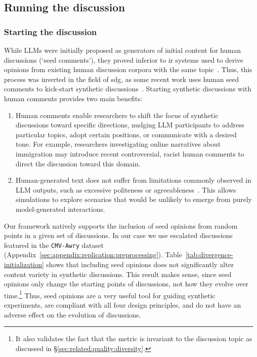 \subsection{Running the discussion}
\label{sec:methodology:management}

\subsubsection{Starting the discussion}
\label{sec:methodology:seed}

While LLMs were initially proposed as generators of initial content for human discussions (`seed comments'), they proved inferior to \ac{ir} systems used to derive opinions from existing human discussion corpora with the same topic~\cite{small-polis-llm}. Thus, this process was inverted in the field of \ac{sdg}, as some recent work uses human seed comments to kick-start synthetic discussions~\cite{balog_2024, cho-etal-2024-language}. Starting synthetic discussions with human comments provides two main benefits:

\begin{enumerate}
	\item Human comments enable researchers to shift the focus of synthetic discussions toward specific directions, nudging LLM participants to address particular topics, adopt certain positions, or communicate with a desired tone. For example, researchers investigating online narratives about immigration may introduce recent controversial, racist human comments to direct the discussion toward this domain.
	
	\item Human-generated text does not suffer from limitations commonly observed in LLM outputs, such as excessive politeness or agreeableness~\cite{park_2023_game,anthis_2025,rossi_2024}. This allows simulations to explore scenarios that would be unlikely to emerge from purely model-generated interactions.
\end{enumerate}

Our framework natively supports the inclusion of seed opinions from random points in a given set of discussions. In our case we use escalated discussions featured in the \texttt{CMV-Awry} dataset \cite{chang-danescu-niculescu-mizil-2019-trouble} (Appendix~\ref{sec:appendix:replication:preprocessing}). Table~\ref{tab:divergence-initialization} shows that including seed opinions does not significantly alter content variety in synthetic discussions. This result makes sense, since seed opinions only change the starting points of discussions, not how they evolve over time.\footnote {It also validates the fact that the \diversity metric is invariant to the discussion topic as discussed in \S\ref{sec:related:quality:diversity}.} Thus, seed opinions are a very useful tool for guiding synthetic experiments, are compliant with all four design principles, and do not have an adverse effect on the evolution of discussions.

